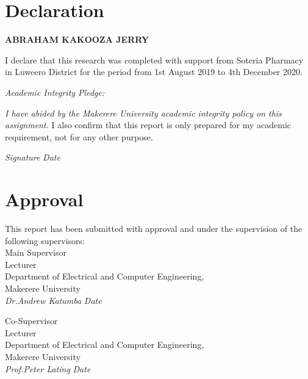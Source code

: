 \documentclass[12pt]{report}
\begin{document}
				


\section*{Declaration}

\textbf{ABRAHAM KAKOOZA JERRY}

I declare that this research was completed with support from Soteria Pharmacy in Luweero District for the period from 1st August 2019 to 4th December 2020.

\emph{Academic Integrity Pledge:}

\emph{
  I have abided by the Makerere University academic integrity policy on this
assignment.
}
I also confirm that this report is only prepared for my academic requirement, not for any other
purpose.


\emph{Signature} \hspace{0.5cm} \makebox[1.5in]{\hrulefill} \hspace{0.5cm} \emph{Date} \hspace{0.5cm} \makebox[1.5in]{\hrulefill}

\newpage


\section*{Approval}

\vspace{2cm}
\begin{center}
  This report has been submitted with approval and under the supervision of the following
  supervisors:\\
  
  Main Supervisor\\
  Lecturer\\
  Department of Electrical and Computer Engineering,\\
  Makerere University\\

  \emph{Dr.Andrew Katumba} \hspace{0.5cm} \makebox[1.5in]{\hrulefill} \hspace{0.5cm} \emph{Date} \hspace{0.5cm} \makebox[1.5in]{\hrulefill}

 
  Co-Supervisor\\
  Lecturer\\
  Department of Electrical and Computer Engineering,\\
  Makerere University\\
  \emph{Prof.Peter Lating} \hspace{0.5cm} \makebox[1.5in]{\hrulefill} \hspace{0.5cm} \emph{Date} \hspace{0.5cm} \makebox[1.5in]{\hrulefill}


\end{center}
\end{document}
